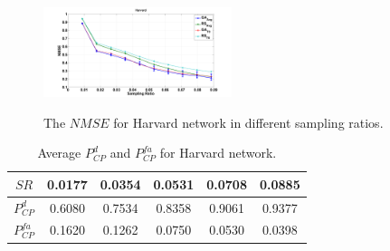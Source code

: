 \begin{figure}
  \begin{center}
    {\includegraphics[keepaspectratio, width=0.49\textwidth]{HarvardGADelay.png}}
  \caption{{{The $NMSE$ for Harvard network in different sampling ratios.}}}
  \label{fig:HarvardGADelayNoise}
  \end{center}
\end{figure}

\begin{table}
	\centering
		\begin{tabular}{| c | c | c | c | c | c |}
		\hline
       $SR$           &    0.0177  &  0.0354  &  0.0531  &  0.0708  &  0.0885  \\ \hline
      $P^{d}_{CP}$    &    0.6080  &  0.7534  &  0.8358  &  0.9061  &  0.9377  \\ \hline
      $P^{fa}_{CP}$   &    0.1620  &  0.1262  &  0.0750  &  0.0530  &  0.0398  \\ \hline
    \end{tabular}
	\vspace{0.15cm}
	\caption{{Average $P^{d}_{CP}$ and $P^{fa}_{CP}$ for Harvard network.}}
	\label{tab:PdfaHarvard}
\end{table}


